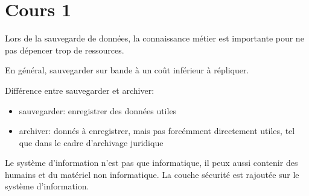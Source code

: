\section{Cours 1}
Lors de la sauvegarde de donn\'ees, la connaissance m\'etier est importante pour ne pas d\'epencer trop de ressources.

En g\'en\'eral, sauvegarder sur bande \`a un co\^ut inf\'erieur \`a r\'epliquer.

Diff\'erence entre sauvegarder et archiver:
\begin{itemize}
  \item sauvegarder: enregistrer des donn\'ees utiles
  \item archiver: donn\'es \`a enregistrer, mais pas forc\'emment directement utiles, tel que dans le cadre d'archivage
  juridique
\end{itemize}

Le syst\`eme d'information n'est pas que informatique, il peux aussi contenir des humains et du mat\'eriel non
informatique. La couche s\'ecurit\'e est rajout\'ee sur le syst\`eme d'information.
